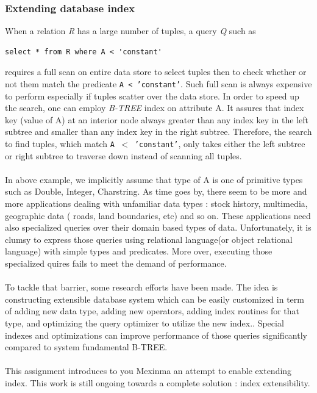 \documentclass[12pt]{article}
\begin{document}
\subsubsection{Extending database index}
When a relation \emph{R} has a large number of tuples, a query \emph{Q} such as \\
\begin{lstlisting}[caption=A general query to select tuples in a given range]
select * from R where A < 'constant'
\end{lstlisting}
requires a full scan on entire data store to select tuples then to check whether or not them match the predicate \texttt{A < 'constant'}. Such full scan is always expensive to perform especially if tuples scatter over the data store. In order to speed up the search, one can employ \emph{B-TREE} index on attribute A. It assures that index key (value of A) at an interior node always greater than any index key in the left subtree and smaller than any index key in the right subtree. Therefore, the search to find tuples, which match \texttt{A $<$ 'constant'}, only takes either the left subtree or right subtree to traverse down instead of scanning all tuples.\\\\
In above example, we implicitly assume that type of A is one of primitive types such as Double, Integer, Charstring. As time goes by, there seem to be more and more applications dealing with unfamiliar data types : stock history, multimedia, geographic data ( roads, land boundaries, etc) and so on.  These applications need also specialized queries over their domain based types of data. Unfortunately, it is clumsy to express those queries using relational language(or object relational language) with simple types and predicates. More over, executing those specialized quires fails to meet the demand of performance.\\\\
To tackle that barrier, some research efforts have been made. The idea is constructing extensible database system which can be easily customized in term of adding new data type, adding new operators, adding index routines for that type, and optimizing the query optimizer to utilize the new index.\cite{GIST95}. Special indexes and optimizations can improve performance of those queries significantly compared to system fundamental B-TREE.\\\\
This assignment introduces to you Mexinma an attempt to enable extending index. This work is still ongoing towards a complete solution : index extensibility.
\end{document}
